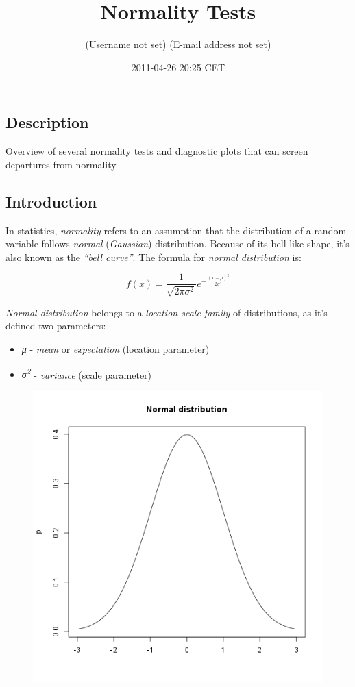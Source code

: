 \documentclass[]{article}
\title{Normality Tests}
\author{(Username not set) (E-mail address not set)}
\date{2011-04-26 20:25 CET}
\makeatletter
\def\maxwidth{\ifdim\Gin@nat@width>\linewidth\linewidth
\else\Gin@nat@width\fi}
\let\Oldincludegraphics\includegraphics
\renewcommand{\includegraphics}[1]{\Oldincludegraphics[width=\maxwidth]{#1}}
\makeatother
\begin{document}
\maketitle

\subsection{Description}

Overview of several normality tests and diagnostic plots that can screen
departures from normality.

\subsection{Introduction}

In statistics, \emph{normality} refers to an assumption that the
distribution of a random variable follows \emph{normal}
(\emph{Gaussian}) distribution. Because of its bell-like shape, it's
also known as the \emph{``bell curve''}. The formula for \emph{normal
distribution} is:

\[f(x) = \frac{1}{\sqrt{2\pi{}\sigma{}^2}} e^{-\frac{(x-\mu{})^2}{2\sigma{}^2}}\]

\emph{Normal distribution} belongs to a \emph{location-scale family} of
distributions, as it's defined two parameters:

\begin{itemize}
\item
  \emph{μ} - \emph{mean} or \emph{expectation} (location parameter)
\item
  \emph{σ\textsuperscript{2}} - \emph{variance} (scale parameter)
\end{itemize}
\begin{figure}[htbp]
\centering
\includegraphics{2f8c434e103f36ec70966b372838d448.png}
\caption{}
\end{figure}
\end{document}
